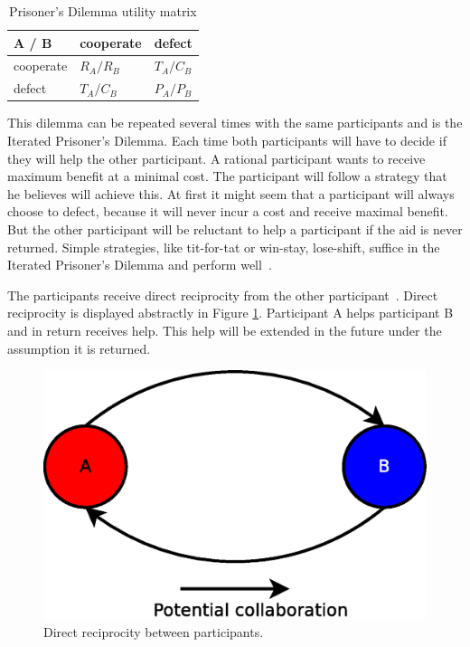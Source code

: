 \begin{table}
\center
	\begin{tabular}{l|ll}
	A / B       & cooperate  & defect     \\ \hline
	cooperate & $R_A /R_B$ & $T_A /C_B$ \\
	defect    & $T_A /C_B$ & $P_A /P_B$
	\end{tabular}
\caption{Prisoner's Dilemma utility matrix}
\label{tab:pd-um}
\end{table}

This dilemma can be repeated several times with the same participants and is the Iterated Prisoner's Dilemma.
Each time both participants will have to decide if they will help the other participant.
A rational participant wants to receive maximum benefit at a minimal cost.
The participant will follow a strategy that he believes will achieve this.
At first it might seem that a participant will always choose to defect,
because it will never incur a cost and receive maximal benefit.
But the other participant will be reluctant to help a participant if the aid is never returned.
Simple strategies, like tit-for-tat or win-stay, lose-shift, suffice in the Iterated Prisoner's Dilemma
and perform well~\cite{Nowak-Cooperation}.

The participants receive direct reciprocity from the other participant~\cite{Nowak-Cooperation}.
Direct reciprocity is displayed abstractly in Figure \ref{fig:direct-reciprocity}.
Participant A helps participant B and in return receives help.
This help will be extended in the future under the assumption it is returned.

\begin{figure}
	\centerline{\includegraphics[scale=0.3]{problemDescription/figs/direct-reciprocity.eps}}
	\caption{Direct reciprocity between participants.}
	\label{fig:direct-reciprocity}
\end{figure}

